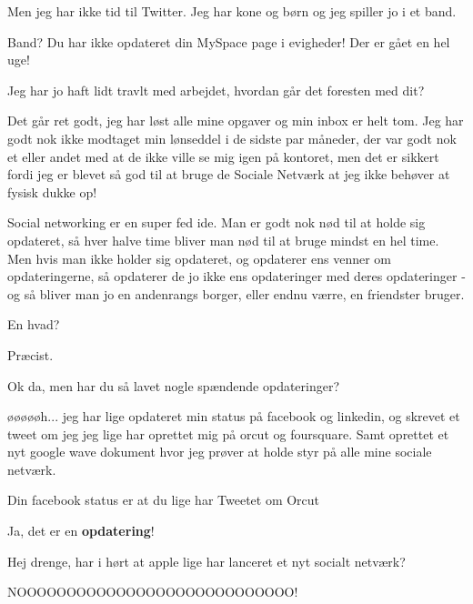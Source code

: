 \documentclass[a4paper,11pt]{article}
\begin{document}
\begin{sketch}
 Men jeg har ikke tid til Twitter. Jeg har kone og b\o{}rn og jeg spiller jo i et band.

 Band? Du har ikke opdateret din MySpace page i evigheder! Der er g\aa{}et en hel uge!

 Jeg har jo haft lidt travlt med arbejdet, hvordan g\aa{}r det foresten med dit?

 Det g\aa{}r ret godt, jeg har l\o{}st alle mine opgaver og min inbox er helt tom.  Jeg har godt nok ikke modtaget min l\o{}nseddel i de sidste par m\aa{}neder, der var godt nok et eller andet med at de ikke ville se mig igen p\aa{} kontoret, men det er sikkert fordi jeg er blevet s\aa{} god til at bruge de Sociale Netv\ae{}rk at jeg ikke beh\o{}ver at fysisk dukke op!

  Social networking er en super fed ide. Man er godt nok n\o{}d til at holde sig opdateret, s\aa{} hver halve time bliver man n\o{}d til at bruge mindst en hel time. Men hvis man ikke holder sig opdateret, og opdaterer ens venner om opdateringerne, s\aa{} opdaterer de jo ikke ens opdateringer med deres opdateringer - og s\aa{} bliver man jo en andenrangs borger, eller endnu v\ae{}rre, en friendster bruger.

 En hvad?

 Pr\ae{}cist.

 Ok da, men har du s\aa{} lavet nogle sp\ae{}ndende opdateringer?

  \o{}\o{}\o{}\o{}\o{}h... jeg har lige opdateret min status p\aa{} facebook og linkedin, og skrevet et tweet om jeg jeg lige har oprettet mig p\aa{} orcut og foursquare.  Samt oprettet et nyt google wave dokument hvor jeg pr\o{}ver at holde styr p\aa{} alle mine sociale netv\ae{}rk.  

  Din facebook status er at du lige har Tweetet om Orcut

  Ja, det er en \textbf{opdatering}!


 Hej drenge, har i h\o{}rt at apple lige har lanceret et nyt socialt netv\ae{}rk?

  NOOOOOOOOOOOOOOOOOOOOOOOOOOOO! 

\end{sketch}
\end{document}
